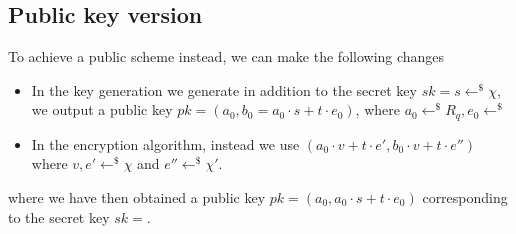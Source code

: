 \documentclass[../main.tex]{subfiles}
\begin{document}
    \subsection{Public key version}
	To achieve a public scheme instead, we can make the following changes
	\begin{itemize}
		\item In the key generation we generate in addition to the secret key $sk = s \leftarrow^{\$} \chi$, we output a public key
		        $pk = (a_0 , b_0 = a_0 \cdot s + t \cdot e_0)$, where $a_0 \leftarrow^{\$} R_q, e_0 \leftarrow^{\$}$
        \item In the encryption algorithm, instead we use 
        $(a_0 \cdot v + t \cdot e', b_0 \cdot v + t \cdot e'')$ where
        $v, e' \leftarrow^{\$} \chi$ and $e'' \leftarrow^{\$} \chi '$.
	\end{itemize}
    where we have then obtained a public key $pk = (a_0, a_0 \cdot s + t \cdot e_0)$
    corresponding to the secret key $sk = $.
    
\end{document}

